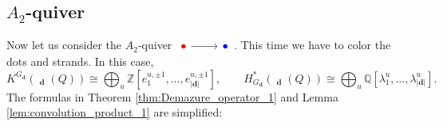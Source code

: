 \documentclass[reqno,11pt]{book}
\numberwithin{equation}{section}
\theoremstyle{plain}
\theoremstyle{plain}
\numberwithin{equation}{section}
\theoremstyle{remark}
\DeclareMathOperator{\RRep}{\widetilde{\operatorname{Rep}}}
\newcommand{\dimvec}[1]{\mathbf{#1}}
\newcommand{\abdimvec}[1]{|\dimvec{#1}|}
\begin{document}
\subsection{$A_2$-quiver}
Now let us consider the $A_2$-quiver $\begin{tikzcd}[ampersand replacement=\&]
	\textcolor{red}{\bullet} \& \textcolor{blue}{\bullet} 
	\arrow[from=1-1, to=1-2]
 \end{tikzcd}$. This time we have to color the dots and strands. In this case,
$$K^{G_{\dimvec{d}}} \left(\RRep_{\dimvec{d}}(Q)\right) \cong \bigoplus_{u} \mathbb{Z}\!\left[ e_1^{u,\pm 1},\ldots,e_{\abdimvec{d}}^{u,\pm 1} \right], \qquad H_{G_{\dimvec{d}}}^{*}\!\!\left(\RRep_{\dimvec{d}}(Q)\right) \cong \bigoplus_{u} \mathbb{Q}\left[\lambda_1^{u},\ldots,\lambda_{\abdimvec{d}}^{u}\right].$$
The formulas in Theorem \ref{thm:Demazure_operator_1} and Lemma \ref{lem:convolution_product_1} are simplified: 
\begingroup
\allowdisplaybreaks
\end{document}
